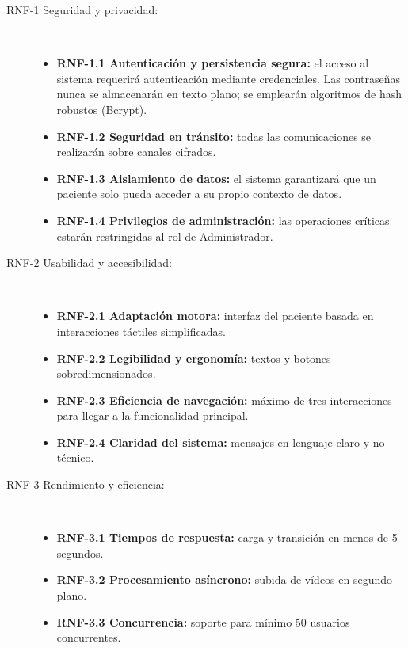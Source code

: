 \begin{description}
    \item[RNF-1 Seguridad y privacidad:] \mbox{} \\ 
    \begin{itemize}
        \item \textbf{RNF-1.1 Autenticación y persistencia segura:} el acceso al sistema requerirá autenticación mediante credenciales. Las contraseñas nunca se almacenarán en texto plano; se emplearán algoritmos de hash robustos (Bcrypt)\cite{bcrypt_algo}.
        \item \textbf{RNF-1.2 Seguridad en tránsito:} todas las comunicaciones se realizarán sobre canales cifrados.
        \item \textbf{RNF-1.3 Aislamiento de datos:} el sistema garantizará que un paciente solo pueda acceder a su propio contexto de datos.
        \item \textbf{RNF-1.4 Privilegios de administración:} las operaciones críticas estarán restringidas al rol de Administrador.
    \end{itemize}

    \item[RNF-2 Usabilidad y accesibilidad:] \mbox{} \\
    \begin{itemize}
        \item \textbf{RNF-2.1 Adaptación motora:} interfaz del paciente basada en interacciones táctiles simplificadas.
        \item \textbf{RNF-2.2 Legibilidad y ergonomía:} textos y botones sobredimensionados.
        \item \textbf{RNF-2.3 Eficiencia de navegación:} máximo de tres interacciones para llegar a la funcionalidad principal.
        \item \textbf{RNF-2.4 Claridad del sistema:} mensajes en lenguaje claro y no técnico.
    \end{itemize}

    \item[RNF-3 Rendimiento y eficiencia:] \mbox{} \\
    \begin{itemize}
        \item \textbf{RNF-3.1 Tiempos de respuesta:} carga y transición en menos de 5 segundos.
        \item \textbf{RNF-3.2 Procesamiento asíncrono:} subida de vídeos en segundo plano.
        \item \textbf{RNF-3.3 Concurrencia:} soporte para mínimo 50 usuarios concurrentes.
    \end{itemize}


\end{description}
